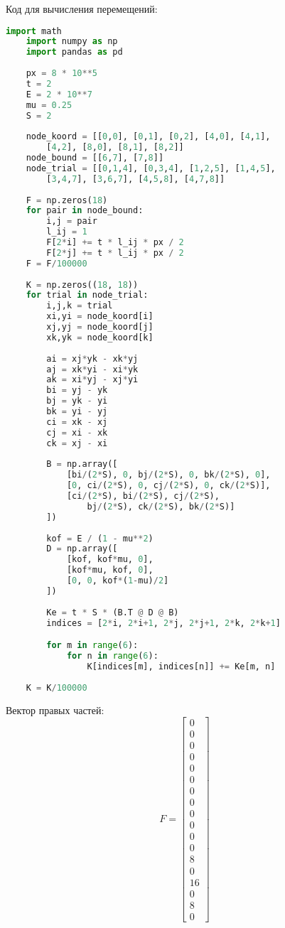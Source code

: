 \documentclass[a4paper, 12pt]{article}
\begin{document}
\newpage

Код для вычисления перемещений:
\begin{lstlisting}[language=Python]
	import math
	import numpy as np
	import pandas as pd
	
	px = 8 * 10**5
	t = 2
	E = 2 * 10**7
	mu = 0.25
	S = 2
	
	node_koord = [[0,0], [0,1], [0,2], [4,0], [4,1], 
		[4,2], [8,0], [8,1], [8,2]]
	node_bound = [[6,7], [7,8]]
	node_trial = [[0,1,4], [0,3,4], [1,2,5], [1,4,5], 
		[3,4,7], [3,6,7], [4,5,8], [4,7,8]]
	
	F = np.zeros(18)
	for pair in node_bound:
		i,j = pair
		l_ij = 1
		F[2*i] += t * l_ij * px / 2
		F[2*j] += t * l_ij * px / 2
	F = F/100000
	
	K = np.zeros((18, 18))
	for trial in node_trial:
		i,j,k = trial
		xi,yi = node_koord[i]
		xj,yj = node_koord[j]
		xk,yk = node_koord[k]
	
		ai = xj*yk - xk*yj
		aj = xk*yi - xi*yk
		ak = xi*yj - xj*yi
		bi = yj - yk
		bj = yk - yi
		bk = yi - yj
		ci = xk - xj
		cj = xi - xk
		ck = xj - xi
	
		B = np.array([
			[bi/(2*S), 0, bj/(2*S), 0, bk/(2*S), 0],
			[0, ci/(2*S), 0, cj/(2*S), 0, ck/(2*S)],
			[ci/(2*S), bi/(2*S), cj/(2*S), 
				bj/(2*S), ck/(2*S), bk/(2*S)]
		])
	
		kof = E / (1 - mu**2)
		D = np.array([
			[kof, kof*mu, 0],
			[kof*mu, kof, 0],
			[0, 0, kof*(1-mu)/2]
		])
	
		Ke = t * S * (B.T @ D @ B)
		indices = [2*i, 2*i+1, 2*j, 2*j+1, 2*k, 2*k+1]

		for m in range(6):
			for n in range(6):
				K[indices[m], indices[n]] += Ke[m, n]
	
	K = K/100000
\end{lstlisting}

Вектор правых частей:
\[
F = 
\begin{bmatrix}
0 \\ 0 \\ 0 \\ 0 \\ 0 \\ 0 \\ 0 \\ 0 \\ 0 \\
0 \\ 0 \\ 0 \\ 8 \\ 0 \\ 16 \\ 0 \\ 8 \\ 0
\end{bmatrix}
\]
\end{document}
